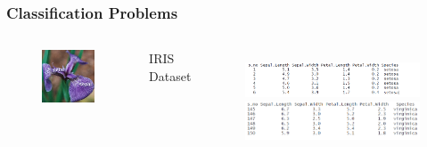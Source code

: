 \documentclass{beamer}
\begin{document}
\begin{frame}
	\frametitle{Classification Problems}
	\begin{columns}[c] %
		
		\begin{figure}
			\includegraphics[width=1\textwidth]{fig/iris-petal.jpg}
			
		\end{figure}
		
		IRIS Dataset
		\begin{figure}
			\includegraphics[width=1.0\textwidth]{fig/irisdata.png} \\
			\includegraphics[width=1.0\textwidth]{fig/irisdata2.png}
		\end{figure}			
	\end{columns}	
	

\end{frame}
\end{document}
